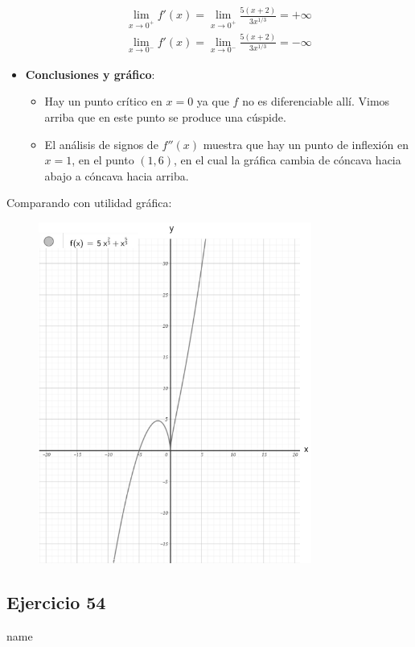 \documentclass[12pt]{article}
\begin{document}
\begin{itemize}
\begin{align*}
    \lim_{x \to 0^+} f'(x) = \lim_{x \to 0^+} \frac{5(x+2)}{3x^{1/3}}  = +\infty \\
    \lim_{x \to 0^-} f'(x) = \lim_{x \to 0^-} \frac{5(x+2)}{3x^{1/3}}  = -\infty 
  \end{align*}
\item \textbf{Conclusiones y gráfico}:
  \begin{itemize}
  \item Hay un punto crítico en $x = 0$ ya que $f$ no es diferenciable allí. Vimos arriba que en este punto se produce una cúspide.
  \item El análisis de signos de $f''(x)$ muestra que hay un punto de inflexión en $x = 1$, en el punto $(1,6)$, en el cual la gráfica cambia de cóncava hacia abajo a cóncava hacia arriba.
  \end{itemize}
\end{itemize}

Comparando con utilidad gráfica:
\begin{figure}[H]
\centering
\includegraphics[width=0.8\textwidth]{../img/img_Lista3/p3_36.png}
\end{figure}



\subsection{Ejercicio 54} name \\
\end{document}
